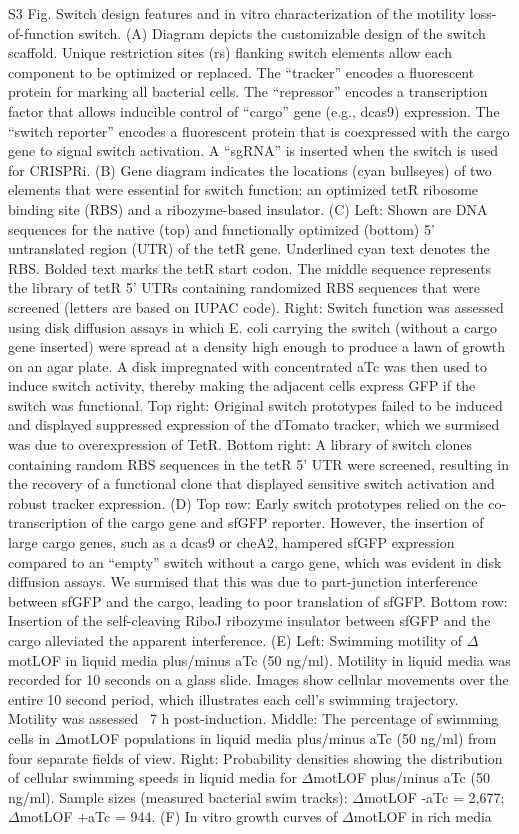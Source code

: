 S3 Fig. Switch design features and in vitro characterization of the motility loss-of-function switch. 
(A) Diagram depicts the customizable design of the switch scaffold. Unique restriction sites (rs) flanking switch elements allow each component to be optimized or replaced. The ``tracker'' encodes a fluorescent protein for marking all bacterial cells. The ``repressor'' encodes a transcription factor that allows inducible control of ``cargo'' gene (e.g., dcas9) expression. The ``switch reporter'' encodes a fluorescent protein that is coexpressed with the cargo gene to signal switch activation. A ``sgRNA'' is inserted when the switch is used for CRISPRi. (B) Gene diagram indicates the locations (cyan bullseyes) of two elements that were essential for switch function: an optimized tetR ribosome binding site (RBS) and a ribozyme-based insulator. (C) Left: Shown are DNA sequences for the native (top) and functionally optimized (bottom) 5' untranslated region (UTR) of the tetR gene. Underlined cyan text denotes the RBS. Bolded text marks the tetR start codon. The middle sequence represents the library of tetR 5' UTRs containing randomized RBS sequences that were screened (letters are based on IUPAC code). Right: Switch function was assessed using disk diffusion assays in which E. coli carrying the switch (without a cargo gene inserted) were spread at a density high enough to produce a lawn of growth on an agar plate. A disk impregnated with concentrated aTc was then used to induce switch activity, thereby making the adjacent cells express GFP if the switch was functional. Top right: Original switch prototypes failed to be induced and displayed suppressed expression of the dTomato tracker, which we surmised was due to overexpression of TetR. Bottom right: A library of switch clones containing random RBS sequences in the tetR 5' UTR were screened, resulting in the recovery of a functional clone that displayed sensitive switch activation and robust tracker expression. (D) Top row: Early switch prototypes relied on the co-transcription of the cargo gene and sfGFP reporter. However, the insertion of large cargo genes, such as a dcas9 or cheA2, hampered sfGFP expression compared to an ``empty'' switch without a cargo gene, which was evident in disk diffusion assays. We surmised that this was due to part-junction interference between sfGFP and the cargo, leading to poor translation of sfGFP. Bottom row: Insertion of the self-cleaving RiboJ ribozyme insulator between sfGFP and the cargo alleviated the apparent interference. (E) Left: Swimming motility of $\Delta$motLOF in liquid media plus/minus aTc (50 ng/ml). Motility in liquid media was recorded for 10 seconds on a glass slide. Images show cellular movements over the entire 10 second period, which illustrates each cell's swimming trajectory. Motility was assessed ~7 h post-induction. Middle: The percentage of swimming cells in $\Delta$motLOF populations in liquid media plus/minus aTc (50 ng/ml) from four separate fields of view. Right: Probability densities showing the distribution of cellular swimming speeds in liquid media for $\Delta$motLOF plus/minus aTc (50 ng/ml). Sample sizes (measured bacterial swim tracks): $\Delta$motLOF -aTc = 2,677; $\Delta$motLOF +aTc = 944. (F) In vitro growth curves of $\Delta$motLOF in rich media 